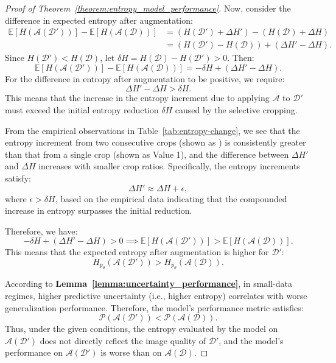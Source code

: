 \begin{proof}[Proof of Theorem~\ref{theorem:entropy_model_performance}]
Now, consider the difference in expected entropy after augmentation:
\begin{align*}
\mathbb{E}\left[ H\left( \mathcal{A}(\mathcal{D}') \right) \right] - \mathbb{E}\left[ H\left( \mathcal{A}(\mathcal{D}) \right) \right] &= \left( H(\mathcal{D}') + \Delta H' \right) - \left( H(\mathcal{D}) + \Delta H \right) \\
&= \left( H(\mathcal{D}') - H(\mathcal{D}) \right) + \left( \Delta H' - \Delta H \right).
\end{align*}
Since $H(\mathcal{D}') < H(\mathcal{D})$, let $\delta H = H(\mathcal{D}) - H(\mathcal{D}') > 0$. Then:
\[
\mathbb{E}\left[ H\left( \mathcal{A}(\mathcal{D}') \right) \right] - \mathbb{E}\left[ H\left( \mathcal{A}(\mathcal{D}) \right) \right] = -\delta H + \left( \Delta H' - \Delta H \right).
\]
For the difference in entropy after augmentation to be positive, we require:
\[
\Delta H' - \Delta H > \delta H.
\]
This means that the increase in the entropy increment due to applying $\mathcal{A}$ to $\mathcal{D}'$ must exceed the initial entropy reduction $\delta H$ caused by the selective cropping.

From the empirical observations in Table~\ref{tab:entropy-change}, we see that the entropy increment from two consecutive crops (shown as ) is consistently greater than that from a single crop (shown as Value 1), and the difference between $\Delta H'$ and $\Delta H$ increases with smaller crop ratios. Specifically, the entropy increments satisfy:
\[
\Delta H' \approx \Delta H + \epsilon,
\]
where $\epsilon > \delta H$, based on the empirical data indicating that the compounded increase in entropy surpasses the initial reduction.

Therefore, we have:
\[
-\delta H + \left( \Delta H' - \Delta H \right) > 0 \implies \mathbb{E}\left[ H\left( \mathcal{A}(\mathcal{D}') \right) \right] > \mathbb{E}\left[ H\left( \mathcal{A}(\mathcal{D}) \right) \right].
\]
This means that the expected entropy after augmentation is higher for $\mathcal{D}'$:
\[
H_{p_\theta}(\mathcal{A}(\mathcal{D}')) > H_{p_\theta}(\mathcal{A}(\mathcal{D})).
\]

According to \textbf{Lemma~\ref{lemma:uncertainty_performance}}, in small-data regimes, higher predictive uncertainty (i.e., higher entropy) correlates with worse generalization performance. Therefore, the model's performance metric satisfies:
\[
\mathcal{P}(\mathcal{A}(\mathcal{D}')) < \mathcal{P}(\mathcal{A}(\mathcal{D})).
\]
Thus, under the given conditions, the entropy evaluated by the model on $\mathcal{A}(\mathcal{D}')$ does not directly reflect the image quality of $\mathcal{D}'$, and the model's performance on $\mathcal{A}(\mathcal{D}')$ is worse than on $\mathcal{A}(\mathcal{D})$.

\end{proof}
